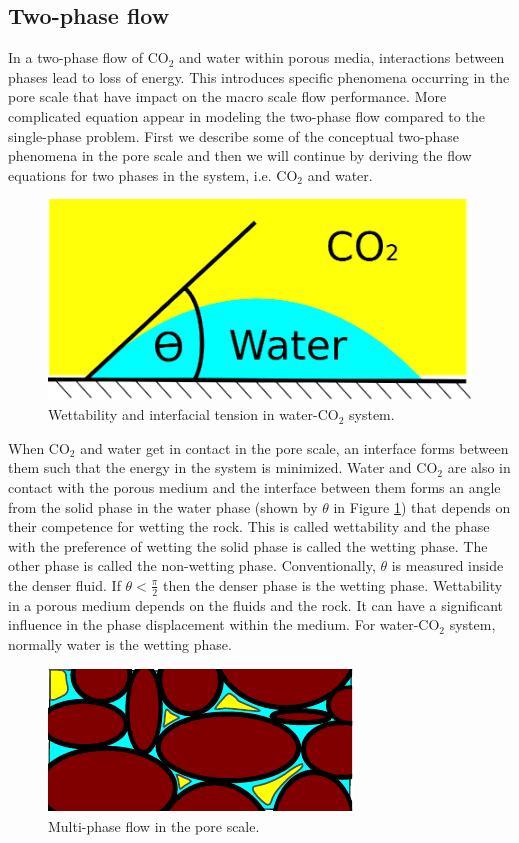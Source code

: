 \subsection{Two-phase flow}

In a two-phase flow of $\mbox{CO}_2$ and water within porous media, interactions
between phases lead to loss of energy. This introduces specific phenomena
occurring in the pore scale that have impact on the macro scale flow
performance.
More complicated equation appear in modeling the two-phase flow compared to the
single-phase problem. First we describe some of the conceptual two-phase
phenomena in the pore scale and then we will continue by deriving the flow
equations for two phases in the system, i.e. $\mbox{CO}_2$ and water.

\begin{figure}
 \centering{}
 \includegraphics[width=0.35\linewidth]{./figurer/wettability.eps}
 \caption{Wettability and interfacial tension in water-$\mbox{CO}_2$ system.}
 \label{fig:wetting}
\end{figure}

When $\mbox{CO}_2$ and water get in contact in the pore scale, an interface
forms between them such that the energy in the system is minimized. Water and
$\mbox{CO}_2$ are also in contact with the porous medium and the interface
between them forms an angle from the solid phase in the water phase (shown by
$\theta$ in Figure \ref{fig:wetting}) that depends on their competence for
wetting the rock. This is called wettability and the phase with the
preference of wetting the solid phase is called the wetting phase. The other
phase is called the non-wetting phase.  Conventionally, $\theta$ is measured
inside the denser fluid. If $\theta < \frac{\pi}{2}$ then the denser phase is
the wetting phase. Wettability in a porous medium depends on the fluids and the
rock. It can have a significant influence in the phase displacement within the
medium. For water-$\mbox{CO}_2$ system, normally water is the wetting phase. 

\begin{figure}
 \centering{}
 \includegraphics[width=0.35\linewidth]{./figurer/K2}
  \caption{Multi-phase flow in the pore scale.}
 \label{fig:mphf}
\end{figure}


